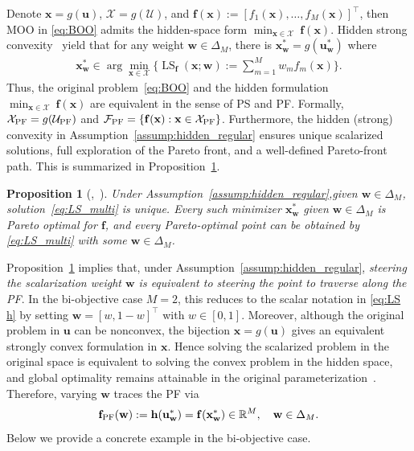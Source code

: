 \documentclass{article}
\newtheorem{proposition}{Proposition}
\newcommand{\bx}{\mathbf{x}}
\newcommand{\bw}{\mathbf{w}}
\newcommand{\bu}{\mathbf{u}}
\newcommand{\X}{\mathcal{X}}
\newcommand{\U}{\mathcal{U}}
\newcommand{\LS}{\operatorname{LS}}
\newcommand{\f}{\mathbf{f}}
\newcommand{\h}{\mathbf{h}}
\newcommand{\fPF}{{\mathbf{f}_{\rm PF}}}
\begin{document}
Denote $\bx=g(\bu)$, $\X=g(\U)$, and $\f(\bx)
:=[f_1(\bx),\dots,f_M(\bx)]^\top$, then MOO in \eqref{eq:BOO} admits the hidden-space form $\min_{\bx \in \X}~ \f(\bx)$.
Hidden strong convexity~\citep{fatkhullin2025stochastic} yield that for any weight $\bw\in \Delta_M$, there is $\bx^*_\bw=g(\bu^*_\bw)$ where
\begin{align}
\bx_{\bw}^*\in\arg\min_{\bx \in \X}\big\{\LS_{\mathbf f}(\bx;\bw)
:=\textstyle\sum_{m=1}^M w_m f_m(\bx)\big\}.
\label{eq:LS_multi}
\end{align}
Thus, the original problem~\eqref{eq:BOO} and the hidden formulation~$\min_{\bx \in \X}~ \f(\bx)$ are equivalent in the sense of PS and PF. Formally, $\X_{\rm PF} = g(\U_{\rm PF})$ and $\mathcal F_{\rm PF}=\{\f(\bx): \bx\in\mathcal X_{\rm PF}\}$.
Furthermore, the hidden (strong) convexity in Assumption~\ref{assump:hidden_regular} 
ensures unique scalarized solutions, full exploration of the Pareto front, and a well-defined Pareto-front path.
This is summarized in Proposition~\ref{prop:hidden_cvx_imply}.
\begin{proposition}[{\citep[Theorem~3.5,~Proposition~3.9]{ehrgott2005multicriteria},~\citep[Theorem 3.1.3]{miettinen_nonlinear_1998}}]
\label{prop:hidden_cvx_imply}
Under Assumption~\ref{assump:hidden_regular},given $\mathbf{w}\in \Delta_M$, solution~\eqref{eq:LS_multi} is unique. {Every such minimizer $\bx_{\bw}^*$ given $\mathbf{w}\in \Delta_M$ is Pareto optimal for $\mathbf{f}$, and every Pareto-optimal point can be obtained by \eqref{eq:LS_multi}} with some $\mathbf{w}\in \Delta_M$.
\end{proposition}
Proposition~\ref{prop:hidden_cvx_imply} implies that, under Assumption~\ref{assump:hidden_regular}, \emph{steering the scalarization weight $\bw$ is equivalent to steering the point to traverse along the PF}.
In the bi-objective case $M=2$, this reduces to the scalar notation in \eqref{eq:LS h} by setting $\bw=[w,1-w]^\top$ with $w\in[0,1]$. Moreover, although the original problem in $\bu$ can be nonconvex, the bijection $\bx=g(\bu)$ gives an equivalent strongly convex formulation in $\bx$. Hence solving the scalarized problem in the original space is equivalent to solving the convex problem in the hidden space, and global optimality remains attainable in the original parameterization~\citep{fatkhullin2025stochastic}. Therefore, varying $\bw$ traces the PF via
\begin{align}
\fPF(\bw):=\h(\bu_\bw^*)=\f(\bx_\bw^*)\in\mathbb R^M,\quad \bw\in \Delta_M.
\end{align}
Below we provide a concrete example in the bi-objective case.
\end{document}
